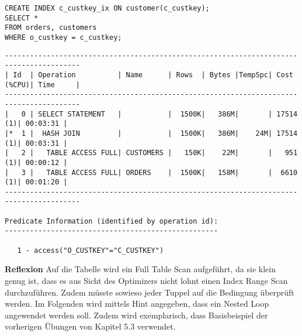 \documentclass[10pt]{article}
\begin{document}
\begin{lstlisting}[style=sql]
CREATE INDEX c_custkey_ix ON customer(c_custkey);
SELECT *
FROM orders, customers
WHERE o_custkey = c_custkey;
\end{lstlisting}
\begin{lstlisting}[style=queryexecutionplan]
----------------------------------------------------------------------------------------
| Id  | Operation          | Name      | Rows  | Bytes |TempSpc| Cost (%CPU)| Time     |
----------------------------------------------------------------------------------------
|   0 | SELECT STATEMENT   |           |  1500K|   386M|       | 17514   (1)| 00:03:31 |
|*  1 |  HASH JOIN         |           |  1500K|   386M|    24M| 17514   (1)| 00:03:31 |
|   2 |   TABLE ACCESS FULL| CUSTOMERS |   150K|    22M|       |   951   (1)| 00:00:12 |
|   3 |   TABLE ACCESS FULL| ORDERS    |  1500K|   158M|       |  6610   (1)| 00:01:20 |
----------------------------------------------------------------------------------------
 
Predicate Information (identified by operation id):
---------------------------------------------------
 
   1 - access("O_CUSTKEY"="C_CUSTKEY")
\end{lstlisting}
\textbf{Reflexion} \newline
Auf die Tabelle wird ein Full Table Scan aufgeführt, da sie klein genug ist, dass es aus Sicht des Optimizers nicht lohnt einen Index Range Scan durchzuführen.
Zudem müsste sowieso jeder Tuppel auf die Bedingung überprüft werden. \newline
\newline
Im Folgenden wird mittels Hint angegeben, dass ein Nested Loop angewendet werden soll.\newline
Zudem wird exemplarisch, dass Basisbeispiel der vorherigen Übungen von Kapitel 5.3 verwendet.\newline
\end{document}
